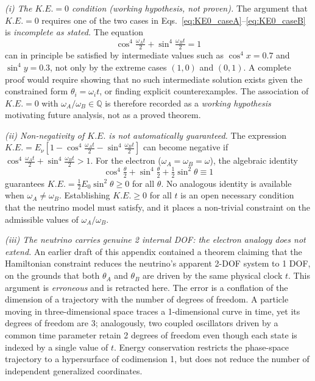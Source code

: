 \documentclass[%
 reprint, amsmath,amssymb, aps, prb, ]{revtex4-2}
\numberwithin{equation}{section}
\begin{document}
\textit{(i) The $K.E.=0$ condition (working hypothesis, not proven).}
The argument that $K.E.=0$ requires one of the two cases in Eqs.~\eqref{eq:KE0_caseA}--\eqref{eq:KE0_caseB} is \emph{incomplete as stated.}
The equation
\begin{equation*}
\cos^4\!\tfrac{\omega_A t}{2} + \sin^4\!\tfrac{\omega_B t}{2} = 1
\end{equation*}
can in principle be satisfied by intermediate values such as $\cos^4 x = 0.7$ and $\sin^4 y = 0.3$, not only by the extreme cases $(1,0)$ and $(0,1)$.
A complete proof would require showing that no such intermediate solution exists given the constrained form $\theta_i = \omega_i t$, or finding explicit counterexamples.
The association of $K.E.=0$ with $\omega_A/\omega_B \in \mathbb{Q}$ is therefore recorded as a \emph{working hypothesis} motivating future analysis, not as a proved theorem.

\textit{(ii) Non-negativity of $K.E.$ is not automatically guaranteed.}
The expression $K.E. = E_\nu[1 - \cos^4\!\tfrac{\omega_A t}{2} - \sin^4\!\tfrac{\omega_B t}{2}]$ can become negative if $\cos^4\!\tfrac{\omega_A t}{2} + \sin^4\!\tfrac{\omega_B t}{2} > 1$.
For the electron ($\omega_A = \omega_B = \omega$), the algebraic identity
\begin{equation*}
\cos^4\!\tfrac{\theta}{2} + \sin^4\!\tfrac{\theta}{2} + \tfrac{1}{2}\sin^2\theta \equiv 1
\end{equation*}
guarantees $K.E. = \tfrac{1}{2}E_0\sin^2\theta \geq 0$ for all $\theta$.
No analogous identity is available when $\omega_A \neq \omega_B$.
Establishing $K.E. \geq 0$ for all $t$ is an open necessary condition that the neutrino model must satisfy, and it places a non-trivial constraint on the admissible values of $\omega_A/\omega_B$.

\textit{(iii) The neutrino carries genuine 2 internal DOF: the electron analogy does not extend.}
An earlier draft of this appendix contained a theorem claiming that the Hamiltonian constraint reduces the neutrino's apparent 2-DOF system to 1 DOF, on the grounds that both $\theta_A$ and $\theta_B$ are driven by the same physical clock $t$.
This argument is \emph{erroneous} and is retracted here.
The error is a conflation of the dimension of a trajectory with the number of degrees of freedom.
A particle moving in three-dimensional space traces a 1-dimensional curve in time, yet its degrees of freedom are 3; analogously, two coupled oscillators driven by a common time parameter retain 2 degrees of freedom even though each state is indexed by a single value of $t$.
Energy conservation restricts the phase-space trajectory to a hypersurface of codimension 1, but does not reduce the number of independent generalized coordinates.
\end{document}
